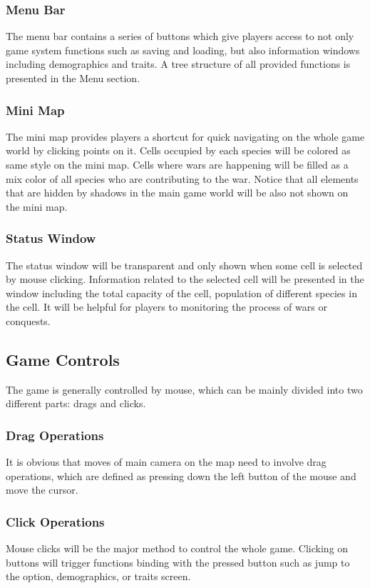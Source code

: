 \documentclass[12pt,a4paper]{article}
\begin{document}
\subsubsection{Menu Bar}
The menu bar contains a series of buttons which give players access to not only game system functions such as saving and loading, but also information windows including demographics and traits. A tree structure of all provided functions is presented in the Menu section.

\subsubsection{Mini Map}
The mini map provides players a shortcut for quick navigating on the whole game world by clicking points on it. Cells occupied by each species will be colored as same style on the mini map. Cells where wars are happening will be filled as a mix color of all species who are contributing to the war. Notice that all elements that are hidden by shadows in the main game world will be also not shown on the mini map.

\subsubsection{Status Window}
The status window will be transparent and only shown when some cell is selected by mouse clicking. Information related to the selected cell will be presented in the window including the total capacity of the cell, population of different species in the cell. It will be helpful for players to monitoring the process of wars or conquests.

\subsection{Game Controls}
The game is generally controlled by mouse, which can be mainly divided into two different parts: drags and clicks.

\subsubsection{Drag Operations}
It is obvious that moves of main camera on the map need to involve drag operations, which are defined as pressing down the left button of the mouse and move the cursor.

\subsubsection {Click Operations}
Mouse clicks will be the major method to control the whole game. Clicking on buttons will trigger functions binding with the pressed button such as jump to the option, demographics, or traits screen.
\end{document}
